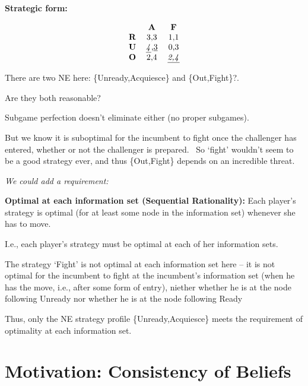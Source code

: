 \documentclass{article}
\begin{document}
\textbf{Strategic form:}

\begin{equation}
\begin{tabular}{ccc}
& \textbf{A} & \textbf{F} \\
\textbf{R} & 3,3 & 1,1 \\
\textbf{U} & \underline{\textit{4}},\underline{3} & 0,3 \\
\textbf{O} & 2,4 & \underline{\textit{2,4}}%
\end{tabular}%
\end{equation}

\bigskip

There are two NE here: \{Unready,Acquiesce\} and \{Out,Fight\}?.\

Are they both reasonable?

\bigskip

Subgame perfection doesn't eliminate either (no proper subgames).

\bigskip

But we know it is suboptimal for the incumbent to fight once the challenger
has entered, whether or not the challenger is prepared. \ So `fight'
wouldn't seem to be a good strategy ever, and thus \{Out,Fight\} depends on
an incredible threat.

\bigskip

\bigskip

\bigskip

\textit{We could add a requirement:}

\textbf{Optimal at each information set (\textbf{Sequential Rationality}):}
Each player's strategy is optimal (for at least some node in the information
set) whenever she has to move.

I.e., each player's strategy must be optimal at each of her information sets.

\bigskip

The strategy `Fight' is not optimal at each information set here -- it is
not optimal for the incumbent to fight at the incumbent's information set
(when he has the move, i.e., after some form of entry), niether whether he
is at the node following Unready nor whether he is at the node following
Ready

\bigskip

Thus, only the NE strategy profile \{Unready,Acquiesce\} meets the
requirement of optimality at each information set.

\bigskip

\section{Motivation: Consistency of Beliefs}
\end{document}
